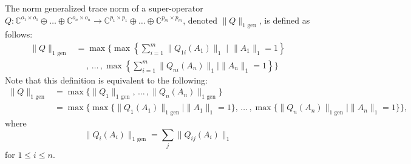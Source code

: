 \begin{definition} \label{def:gen_1norm}
  The norm generalized trace norm of a super-operator $Q: \mathbb{C}^{o_1 \times o_1} \oplus \ldots \oplus \mathbb{C}^{o_n \times o_n}  \rightarrow \mathbb{C}^{p_1 \times p_1} \oplus \ldots \oplus  \mathbb{C}^{p_m \times p_m} $, denoted $\|Q\|_{1 \text{ gen}}$, is defined as follows:
\begin{equation}
  \begin{split}
  \|Q\|_{1 \text{ gen}} & = \max  \Bigg\{ \max \left\{ \sum_{i=1}^{m} \|Q_{1i} (A_1)\|_{1}   \mid \hspace{1pt} \|A_1\|_{1} = 1 \right\} \\
  & \hspace{15pt} ,\hspace{2pt}  \ldots \hspace{2pt}  , \max \left\{ \sum_{i=1}^{m} \|Q_{ni} (A_n)\|_{1}   \mid \|A_n\|_{1} = 1 \right\} \Bigg\} 
  \end{split}
\end{equation}
Note that this definition is equivalent to the following:
\begin{equation} \label{eq:gen_1norm_reduzida}
  \begin{split}
    \|Q\|_{1 \text{ gen}} & =  \max \{ \|Q_1\|_{1 \text{ gen}} , \hspace{2pt}\ldots \hspace{2pt}, \|Q_n (A_n)\|_{1 \text{ gen}}   \} \\
    &= \max \{ \max\{ \|Q_1 (A_1)\|_{1 \text{ gen}}  \mid  \|A_1\|_{1} = 1 \}, \hspace{2pt}\ldots \hspace{2pt}, \max \{ \|Q_n (A_n)\|_{1 \text{ gen}}  \mid  \|A_n\|_{1} = 1 \}  \},
  \end{split}
\end{equation}
   where
    \begin{equation} \label{eq:qi_norm}
        \lVert Q_i (A_i) \rVert_{1  \text{ gen}} = \sum_{j} \lVert Q_{ij} (A_i) \rVert_{1}
    \end{equation}
for $ 1 \leq i \leq n$.

\end{definition}


